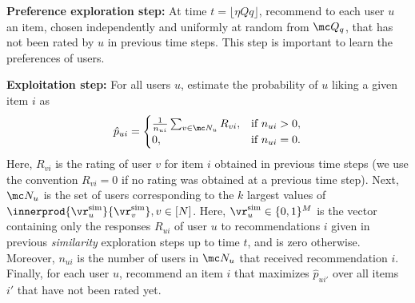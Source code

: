 \documentclass{article}
\newcommand\pf{p_{\mathrm{f}}}
\newcommand{\vratingS}{\vocrating^{\text{sim}}}
\newcommand\ocrating{R}
\newcommand\vocrating{\vr}
\newcommand\ocR{R}
\newcommand{\setQ}{\mc Q}
\begin{document}
{\bf Preference exploration step:}
At time $t = \lfloor \eta Q q \rfloor$, recommend to each user $u$ an item, chosen independently and uniformly at random from $\setQ_q$, that has not been rated by $u$ in previous time steps. %
This step is important to learn the preferences of users. 
%

{\bf Exploitation step:} 
For all users $u$, estimate the probability of $u$ liking a given item $i$ as 
\begin{align}
\hat p_{ui} = 
\begin{cases}
\frac{1}{n_{ui}}   \sum_{v \in \mc N_u} \ocrating_{vi}
, &  \text{if } n_{ui}>0 ,   \\
0, %
& \text{if } n_{ui} = 0.
\end{cases}
\label{eq:defhatpui}
\end{align}
Here, $\ocrating_{vi}$ is the rating of user $v$ for item $i$ obtained in previous time steps (we use the convention $\ocrating_{vi} = 0$ if no rating was obtained at a previous time step).
Next, $\mc N_u$ is the set of users corresponding to the $k$ largest values of 
$
\innerprod{\vratingS_u}{\vratingS_v}, v \in [N]
$. 
Here, $\vratingS_{u} \in \{0,1\}^M$ is the vector containing only the responses $\ocR_{ui}$ of user $u$ to recommendations $i$ given in previous \emph{similarity} exploration steps up to time $t$, and is zero otherwise. 
Moreover, $n_{ui}$ is the number of users in $\mc N_u$ that received recommendation $i$. 
Finally, %
for each user $u$, recommend an item $i$ that maximizes $\hat p_{u i'}$ over all items $i'$ that have not been rated yet. 
\end{document}
